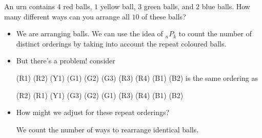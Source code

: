 \begin{example}
    An urn contains $4$ red balls, $1$ yellow ball, $3$ green balls, and $2$ blue balls. How many different ways can you arrange all $10$ of these balls?

    \begin{itemize}
        \item We are arranging   balls. We can use the idea of ${}_nP_k$ to count the number of distinct orderings by taking into account the repeat coloured balls.

        \item But there's a problem! consider 
        
        (R1) (R2) (Y1) (G1) (G2) (G3) (R3) (R4) (B1) (B2) is the same ordering as 

        (R2) (R1) (Y1) (G3) (G2) (G1) (R3) (R4) (B1) (B2)

        \item How might we adjust for these repeat orderings? 

        We count the number of ways to rearrange identical balls. 


\end{itemize}
\end{example}
